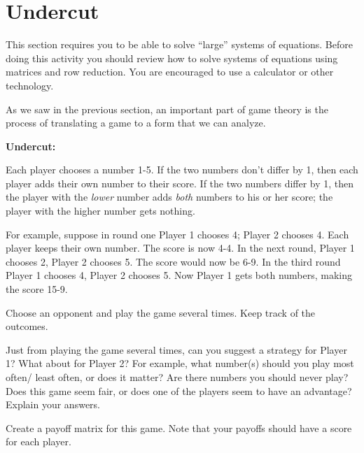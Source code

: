  
\section{Undercut}



This section requires you to be able to solve ``large'' systems of equations. Before doing this activity you should review how to solve systems of equations using matrices and row reduction. You are encouraged to use a calculator or other technology.


As we saw in the previous section, an important part of game theory is the process of translating a game to a form that we can analyze. 

\begin{example}\label{Undercut}\textbf{Undercut:}

Each player chooses a number 1-5. If the two numbers don't differ by 1, then each player adds their own number to their score. If the two numbers differ by 1, then the player with the \emph{lower} number adds \emph{both} numbers to his or her score; the player with the higher number gets nothing.

For example, suppose in round one Player 1 chooses 4; Player 2 chooses 4. Each player keeps their own number. The score is now 4-4. In the next round, Player 1 chooses 2, Player 2 chooses 5. The score would now be 6-9. In the third round Player 1 chooses 4, Player 2 chooses 5. Now Player 1 gets both numbers, making the score 15-9.
\end{example}

\begin{xca}\label{E:Uplay}
Choose an opponent and play the game several times. Keep track of the outcomes.
\end{xca}

\begin{xca}\label{E:Uguessstrat}
Just from playing the game several times, can you suggest a strategy for Player 1? What about for Player 2? For example, what number(s) should you play most often/ least often, or does it matter? Are there numbers you should never play? Does this game seem fair, or does one of the players seem to have an advantage? Explain your answers.
\end{xca}


\begin{xca}\label{E:Upayoff}
Create a payoff matrix for this game. Note that your payoffs should have a score for each player. 
\end{xca}

